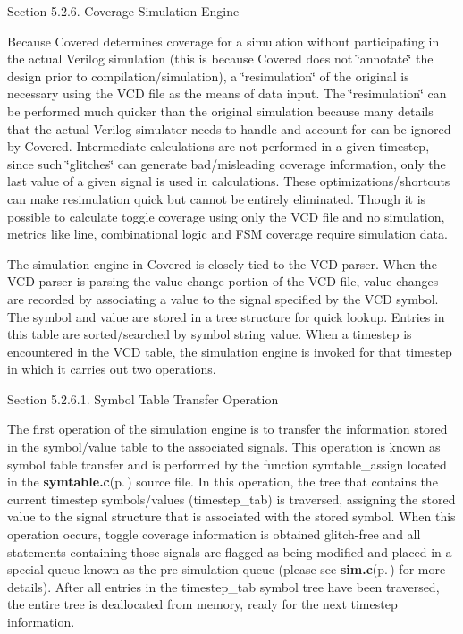 \begin{Desc}
\item[Section 5.2.6. Coverage Simulation Engine]\end{Desc}
\begin{Desc}
\item[]Because Covered determines coverage for a simulation without participating in the actual Verilog simulation (this is because Covered does not \char`\"{}annotate\char`\"{} the design prior to compilation/simulation), a \char`\"{}resimulation\char`\"{} of the original is necessary using the VCD file as the means of data input. The \char`\"{}resimulation\char`\"{} can be performed much quicker than the original simulation because many details that the actual Verilog simulator needs to handle and account for can be ignored by Covered. Intermediate calculations are not performed in a given timestep, since such \char`\"{}glitches\char`\"{} can generate bad/misleading coverage information, only the last value of a given signal is used in calculations. These optimizations/shortcuts can make resimulation quick but cannot be entirely eliminated. Though it is possible to calculate toggle coverage using only the VCD file and no simulation, metrics like line, combinational logic and FSM coverage require simulation data.\end{Desc}
\begin{Desc}
\item[]The simulation engine in Covered is closely tied to the VCD parser. When the VCD parser is parsing the value change portion of the VCD file, value changes are recorded by associating a value to the signal specified by the VCD symbol. The symbol and value are stored in a tree structure for quick lookup. Entries in this table are sorted/searched by symbol string value. When a timestep is encountered in the VCD table, the simulation engine is invoked for that timestep in which it carries out two operations.\end{Desc}
\begin{Desc}
\item[Section 5.2.6.1. Symbol Table Transfer Operation]\end{Desc}
\begin{Desc}
\item[]The first operation of the simulation engine is to transfer the information stored in the symbol/value table to the associated signals. This operation is known as symbol table transfer and is performed by the function symtable\_\-assign located in the {\bf symtable.c}{\rm (p.\,\pageref{symtable_8c})} source file. In this operation, the tree that contains the current timestep symbols/values (timestep\_\-tab) is traversed, assigning the stored value to the signal structure that is associated with the stored symbol. When this operation occurs, toggle coverage information is obtained glitch-free and all statements containing those signals are flagged as being modified and placed in a special queue known as the pre-simulation queue (please see {\bf sim.c}{\rm (p.\,\pageref{sim_8c})} for more details). After all entries in the timestep\_\-tab symbol tree have been traversed, the entire tree is deallocated from memory, ready for the next timestep information.\end{Desc}
